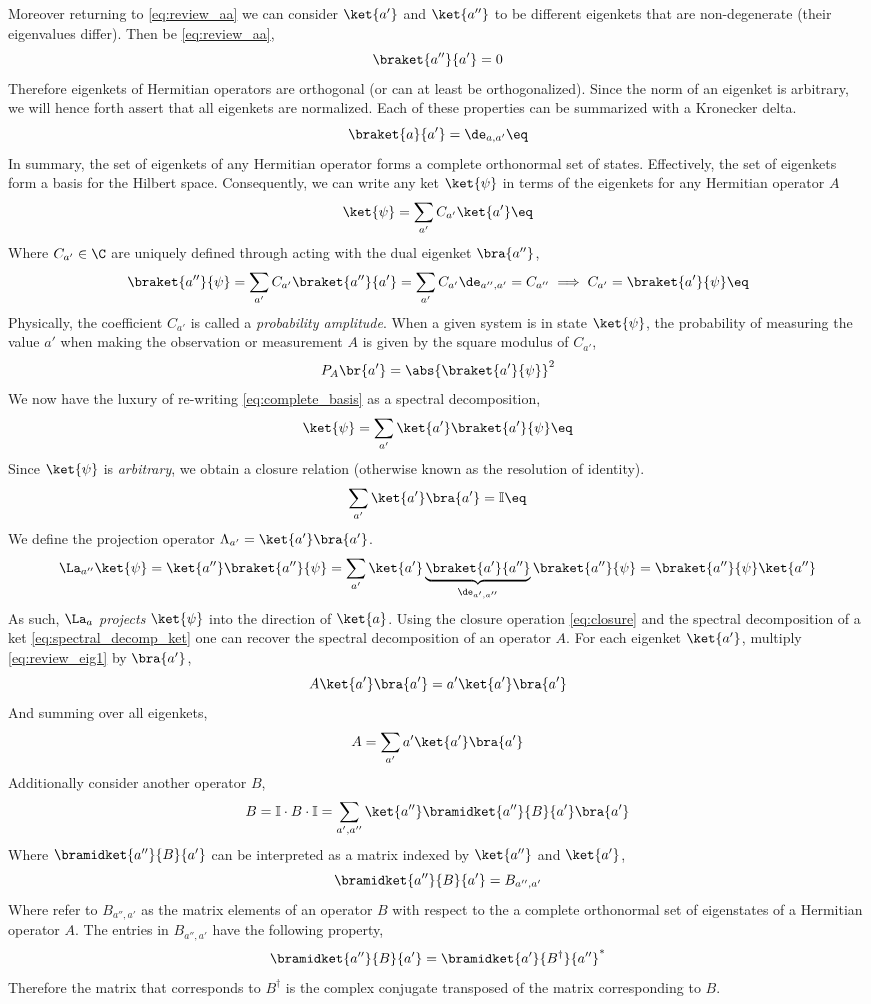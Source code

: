 \documentclass{article}
\begin{document}
Moreover returning to \cref{eq:review_aa} we can consider $\ket{a'}$ and $\ket{a''}$ to be different eigenkets that are non-degenerate (their eigenvalues differ). Then be \cref{eq:review_aa},
\[ \braket{a''}{a'} = 0 \]
Therefore eigenkets of Hermitian operators are orthogonal (or can at least be orthogonalized). Since the norm of an eigenket is arbitrary, we will hence forth assert that all eigenkets are normalized. Each of these properties can be summarized with a Kronecker delta.
\[ \braket{a}{a'} = \de_{a, a'} \eq \label{eq:orthonormality_discrete}\]
In summary, the set of eigenkets of any Hermitian operator forms a complete orthonormal set of states. Effectively, the set of eigenkets form a basis for the Hilbert space. Consequently, we can write any ket $\ket{\psi}$ in terms of the eigenkets for any Hermitian operator $A$
\[ \ket{\psi} = \sum_{a'} C_{a'} \ket{a'} \eq \label{eq:complete_basis}\]
Where $C_{a'} \in \C$ are uniquely defined through acting with the dual eigenket $\bra{a''}$,
\[ \braket{a''}{\psi} = \sum_{a'} C_{a'} \braket{a''}{a'} = \sum_{a'} C_{a'} \de_{a'', a'} = C_{a''} \implies C_{a'} = \braket{a'}{\psi} \eq \label{eq:coeff_determine}\]
Physically, the coefficient $C_{a'}$ is called a \textit{probability amplitude}. When a given system is in state $\ket{\psi}$, the probability of measuring the value $a'$ when making the observation or measurement $A$ is given by the square modulus of $C_{a'}$,
\[ P_{A}\br{a'} = \abs{\braket{a'}{\psi}}^2 \]
We now have the luxury of re-writing \cref{eq:complete_basis} as a spectral decomposition,
\[ \ket{\psi} = \sum_{a'} \ket{a'} \braket{a'}{\psi} \eq \label{eq:spectral_decomp_ket} \]
Since $\ket{\psi}$ is \textit{arbitrary}, we obtain a closure relation (otherwise known as the resolution of identity).
\[ \sum_{a'} \ket{a'} \bra{a'} = \mathbb{I} \eq \label{eq:closure} \]
We define the projection operator $\Lambda_{a'} = \ket{a'}\bra{a'}$.
\[ \La_{a''}\ket{\psi} = \ket{a''}\braket{a''}{\psi} = \sum_{a'} \ket{a'}\underbrace{\braket{a'}{a''}}_{\de_{a', a''}}\braket{a''}{\psi} = \braket{a''}{\psi}\ket{a''} \]
As such, $\La_{a}$ \textit{projects} $\ket{\psi}$ into the direction of $\ket{a}$. Using the closure operation \cref{eq:closure} and the spectral decomposition of a ket \cref{eq:spectral_decomp_ket} one can recover the spectral decomposition of an operator $A$. For each eigenket $\ket{a'}$, multiply \cref{eq:review_eig1} by $\bra{a'}$,
\[ A \ket{a'} \bra{a'} = a' \ket{a'} \bra{a'} \]
And summing over all eigenkets,
\[ A = \sum_{a'} a' \ket{a'}\bra{a'} \]
Additionally consider another operator $B$,
\[ B = \mathbb{I} \cdot B \cdot \mathbb{I} = \sum_{a', a''} \ket{a''}\bramidket{a''}{B}{a'}\bra{a'} \]
Where $\bramidket{a''}{B}{a'}$ can be interpreted as a matrix indexed by $\ket{a''}$ and $\ket{a'}$,
\[ \bramidket{a''}{B}{a'} = B_{a'', a'} \]
Where refer to $B_{a'', a'}$ as the matrix elements of an operator $B$ with respect to the a complete orthonormal set of eigenstates of a Hermitian operator $A$. The entries in $B_{a'', a'}$ have the following property,
\[ \bramidket{a''}{B}{a'} = \bramidket{a'}{B^{\dagger}}{a''}^{*} \]
Therefore the matrix that corresponds to $B^{\dagger}$ is the complex conjugate transposed of the matrix corresponding to $B$.\\
\end{document}

